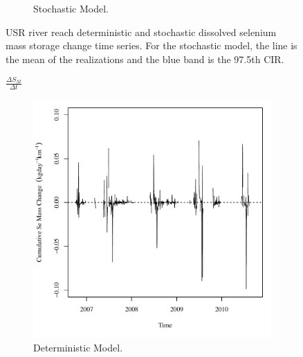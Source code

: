 \begin{landscape}
\begin{figure}
\begin{subfigure}{0.7\textwidth}
			\caption{Stochastic Model.}
		\end{subfigure}
		\caption[USR river reach deterministic and stochastic dissolved selenium mass storage change time series.]{USR river reach deterministic and stochastic dissolved selenium mass storage change time series.  For the stochastic model, the line is the mean of the realizations and the blue band is the 97.5th CIR.}
		\label{fig:massStoreChange_USR}
	\end{figure}
\end{landscape}

\subfiguretop
\begin{landscape}
	\begin{figure}
		$ \displaystyle \frac{\Delta S_{M}}{\Delta t} $
		\begin{subfigure}{0.7\textwidth}
			\centering
			\includegraphics[width=\tableCustomSize]{"Figures/Results_DSR/Deterministic/Balance Mass - Storage"}
			\caption{Deterministic Model.}
		\end{subfigure}%
		\begin{subfigure}{0.7\textwidth}
			\centering

\end{subfigure}
\end{figure}
\end{landscape}
